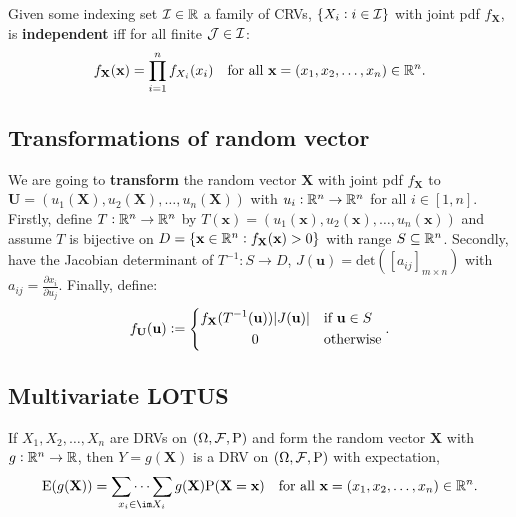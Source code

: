 \documentclass[../Year1/Year1.tex]{subfiles}
\begin{document}
\begingroup\belowdisplayskip=-10pt
\begin{definition}
    Given some indexing set $\mathcal{I}\in\mathbb{R}$ a family of CRVs, $\{X_i:i\in\mathcal{I}\}$ with joint pdf $f_\textbf{X}$, is \textbf{independent} iff for all finite $\mathcal{J}\in\mathcal{I}$: \[
        f_{\textbf{X}}(\textbf{x}) = \prod_{i=1}^nf_{X_i}(x_i) \quad \text{\textcolor{black}{for all }$\textbf{x}=(x_1,x_2,\ldots,x_n)\in\mathbb{R}^n$}
    \textcolor{black}{.}\]
\end{definition}
\endgroup

\subsection{Transformations of random vector}
\begin{definition}[Transformation]
    We are going to \textbf{transform} the random vector $\textbf{X}$ with joint pdf $f_\textbf{X}$ to $\textbf{U}=(u_1(\textbf{X}),u_2(\textbf{X}),\ldots,u_n(\textbf{X}))$ with $u_i: \mathbb{R}^n \rightarrow \mathbb{R}^n$ for all $i\in[1,n]$. Firstly, define $T:\mathbb{R}^n\rightarrow\mathbb{R}^n$ by $T(\textbf{x})=(u_1(\textbf{x}),u_2(\textbf{x}),\ldots,u_n(\textbf{x}))$ and assume $T$ is bijective on $D=\{\textbf{x}\in\mathbb{R}^n:f_\textbf{X}(\textbf{x})>0\}$ with range $S\subseteq\mathbb{R}^n$. Secondly, have the Jacobian determinant of $T^{-1}:S\rightarrow D$, $J(\textbf{u})=\text{det}([a_{ij}]_{m\times n})$ with $a_{ij}=\frac{\partial x_i}{\partial u_j}$. Finally, define: \[
        f_\textbf{U}(\textbf{u}) := \begin{dcases}
            f_\textbf{X}(T^{-1}(\textbf{u}))|J(\textbf{u})| & \text{\textcolor{black}{if }$\textbf{u}\in S$} \\
            \omit\hfil0\hfil & \text{\textcolor{black}{otherwise}}
        \end{dcases}\textcolor{black}{.}
    \]
\end{definition}
\subsection{Multivariate LOTUS}
\begingroup\belowdisplayskip=-10pt
\begin{theorem}
    If $X_1,X_2,\ldots,X_n$ are DRVs on $(\Omega,\mathcal{F},\mathrm{P})$ and form the random vector $\textbf{X}$ with $g:\mathbb{R}^n\rightarrow\mathbb{R}$, then $Y=g(\textbf{X})$ is a DRV on $(\Omega,\mathcal{F},\mathrm{P})$ with expectation, \[
    \E(g(\textbf{X}))=\mathop{\sum\dots\sum}_{x_i\in\im X_i}g(\textbf{X})\P(\textbf{X}=\textbf{x})
    \quad \text{\textcolor{black}{for all }$\textbf{x}=(x_1,x_2,\ldots,x_n)\in\RR^n$}
    \textcolor{black}{.}
    \]
\end{theorem}
\end{document}

